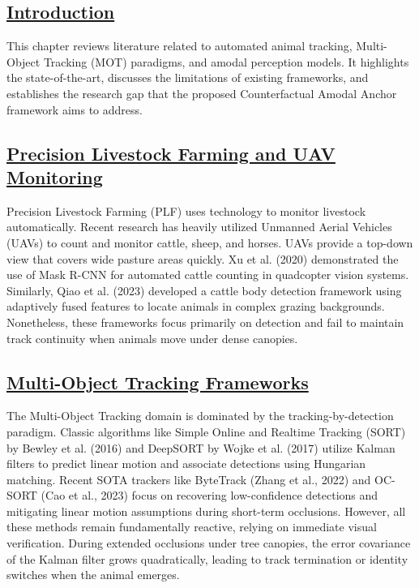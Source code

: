 \documentclass[12pt]{article}
\begin{document}
\subsection*{\underline{\textbf{Introduction}}}
This chapter reviews literature related to automated animal tracking, Multi-Object Tracking (MOT) paradigms, and amodal perception models. It highlights the state-of-the-art, discusses the limitations of existing frameworks, and establishes the research gap that the proposed Counterfactual Amodal Anchor framework aims to address.

\subsection*{\underline{\textbf{Precision Livestock Farming and UAV Monitoring}}}
Precision Livestock Farming (PLF) uses technology to monitor livestock automatically. Recent research has heavily utilized Unmanned Aerial Vehicles (UAVs) to count and monitor cattle, sheep, and horses. UAVs provide a top-down view that covers wide pasture areas quickly. Xu et al. (2020) demonstrated the use of Mask R-CNN for automated cattle counting in quadcopter vision systems. Similarly, Qiao et al. (2023) developed a cattle body detection framework using adaptively fused features to locate animals in complex grazing backgrounds. Nonetheless, these frameworks focus primarily on detection and fail to maintain track continuity when animals move under dense canopies.

\subsection*{\underline{\textbf{Multi-Object Tracking Frameworks}}}
The Multi-Object Tracking domain is dominated by the tracking-by-detection paradigm. Classic algorithms like Simple Online and Realtime Tracking (SORT) by Bewley et al. (2016) and DeepSORT by Wojke et al. (2017) utilize Kalman filters to predict linear motion and associate detections using Hungarian matching. Recent SOTA trackers like ByteTrack (Zhang et al., 2022) and OC-SORT (Cao et al., 2023) focus on recovering low-confidence detections and mitigating linear motion assumptions during short-term occlusions. However, all these methods remain fundamentally reactive, relying on immediate visual verification. During extended occlusions under tree canopies, the error covariance of the Kalman filter grows quadratically, leading to track termination or identity switches when the animal emerges.
\end{document}
